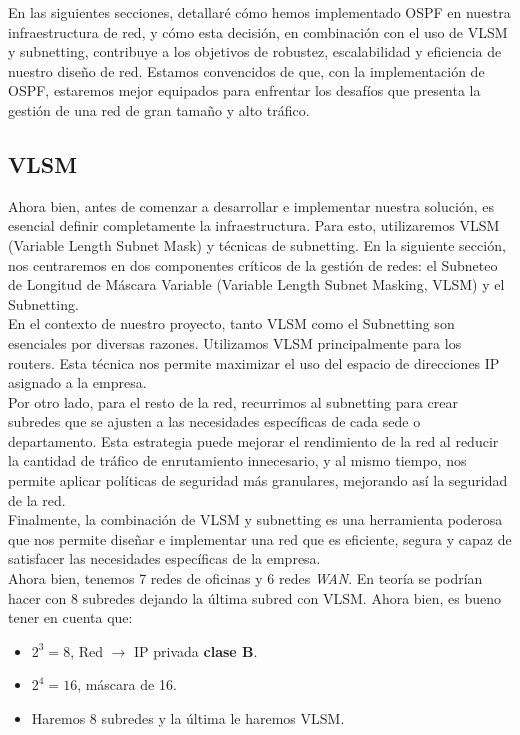 En las siguientes secciones, detallaré cómo hemos implementado OSPF en nuestra
infraestructura de red, y cómo esta decisión, en combinación con el uso de VLSM
y subnetting, contribuye a los objetivos de robustez, escalabilidad y
eficiencia de nuestro diseño de red. Estamos convencidos de que, con la
implementación de OSPF, estaremos mejor equipados para enfrentar los desafíos
que presenta la gestión de una red de gran tamaño y alto tráfico.

\subsection{VLSM}

Ahora bien, antes de comenzar a desarrollar e implementar nuestra solución, es
esencial definir completamente la infraestructura. Para esto, utilizaremos
VLSM (Variable Length Subnet Mask) y técnicas de subnetting. En la siguiente
sección, nos centraremos en dos componentes críticos de la gestión de redes:
el Subneteo de Longitud de Máscara Variable
(Variable Length Subnet Masking, VLSM) y el Subnetting.
\\


En el contexto de nuestro proyecto, tanto VLSM como el Subnetting son esenciales
por diversas razones. Utilizamos VLSM principalmente para los routers. Esta
técnica nos permite maximizar el uso del espacio de direcciones IP asignado a
la empresa.
\\


Por otro lado, para el resto de la red, recurrimos al subnetting para crear
subredes que se ajusten a las necesidades específicas de cada sede o
departamento. Esta estrategia puede mejorar el rendimiento de la red al reducir
la cantidad de tráfico de enrutamiento innecesario, y al mismo tiempo, nos
permite aplicar políticas de seguridad más granulares, mejorando así la
seguridad de la red.
\\

Finalmente, la combinación de VLSM y subnetting es una herramienta poderosa que
nos permite diseñar e implementar una red que es eficiente, segura y capaz de
satisfacer las necesidades específicas de la empresa.
\\

Ahora bien, tenemos 7 redes de oficinas y 6 redes \textit{WAN}. En teoría se
podrían hacer con 8 subredes dejando la última subred con VLSM. Ahora bien, es
bueno tener en cuenta que:

\begin{itemize}
    \item \(2^3 = 8\), Red \(\rightarrow\) IP privada \textbf{clase B}.
    \item \(2^4 = 16\), máscara de 16.
    \item Haremos 8 subredes y la última le haremos VLSM.
\end{itemize}

